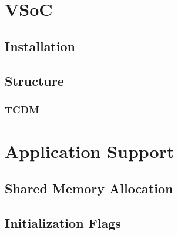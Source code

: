 \documentclass{article}
\title{
\vspace{2in}
\textmd{\textbf{\hmwkClass}}\\
\textmd{\textbf{\hmwkTitle}}\\
\normalsize\vspace{0.1in}\small{\hmwkDueDate}\\
\vspace{0.1in}\large{\textit{\hmwkClassInstructor}}
\vspace{3in}
}
\author{\textbf{\hmwkAuthorName}}
\date{}
\begin{document}
\maketitle


\setcounter{tocdepth}{3} %

\newpage
\tableofcontents
\newpage




\section{VSoC}

\subsection{Installation}
\subsection{Structure}
\subsubsection{TCDM}


\section{Application Support}

\subsection{Shared Memory Allocation}
\subsection{Initialization Flags}
\end{document}
